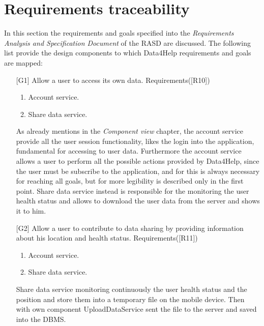 \section{Requirements traceability}
In this section the requirements and goals specified into the \textit{Requirements Analysis and Specification Document} of the RASD are discussed. The following list provide the design components to which Data4Help requirements and goals are mapped: 
\begin{itemize}
\item[{[G1]}] Allow a user to access its own data. Requirements([R10])
	\begin{enumerate}
	\item Account service.
	\item Share data service.
	\end{enumerate}
As already mentions in the \textit{Component view} chapter, the account service provide all the user session functionality, likes the login into the application, fundamental for accessing to user data. Furthermore the account service allows a user to perform all the possible actions provided by Data4Help, since the user must be subscribe to the application, and for this is always necessary for reaching all goals, but for more legibility is described only in the first point. Share data service instead is responsible for the monitoring the user health status and allows to download the user data from the server and shows it to him.

\item[{[G2]}] Allow a user to contribute to data sharing by providing information about his location and health status. Requirements([R11])
	\begin{enumerate}
	\item Account service.
	\item Share data service.
	\end{enumerate}
Share data service monitoring continuously the user health status and the position and store them into a temporary file on the mobile device. Then with own component UploadDataService sent the file to the server and saved into the DBMS.


\end{itemize}

